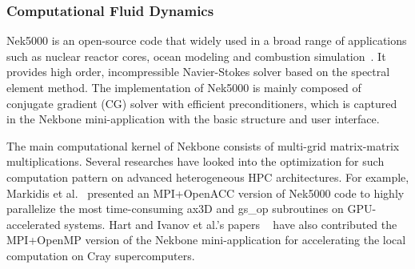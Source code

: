 \subsubsection{Computational Fluid Dynamics}

Nek5000 is an open-source code that widely used in a broad range of
applications such as nuclear reactor cores, ocean modeling and combustion
simulation~\cite{nek5000}. It provides high order, incompressible
Navier-Stokes solver based on the spectral element method. The implementation
of Nek5000 is mainly composed of conjugate gradient (CG) solver with
efficient preconditioners, which is captured in the Nekbone mini-application
with the basic structure and user interface.

The main computational kernel of Nekbone consists of multi-grid matrix-matrix
multiplications. Several researches have looked into the optimization for
such computation pattern on advanced heterogeneous HPC architectures. For
example, Markidis et al.~\cite{nek-openacc} presented an MPI+OpenACC version
of Nek5000 code to highly parallelize the most time-consuming ax3D and
gs\_op subroutines on GPU-accelerated systems. Hart and Ivanov et al.'s papers
~\cite{nek-eva, nek-openmp4} have also contributed the MPI+OpenMP version of
the Nekbone mini-application for accelerating the local computation on
Cray supercomputers.

